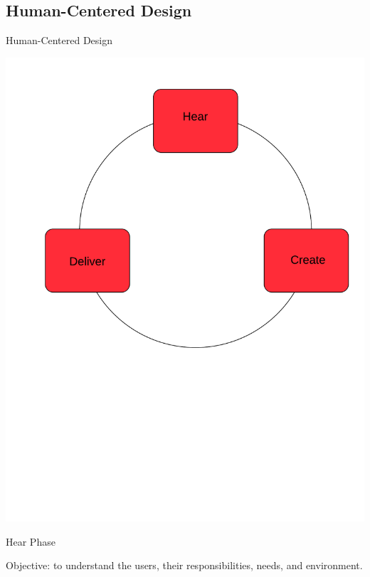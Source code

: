 \documentclass[xcolor=x11names, handout, compress]{beamer}
\renewcommand{\(}{\begin{columns}}
\renewcommand{\)}{\end{columns}}
\newcommand{\<}[1]{\begin{column}{#1}}
\renewcommand{\>}{\end{column}}
\begin{document}
\subsection{Human-Centered Design}
\begin{frame}[t]{Human-Centered Design}
\centerline{\includegraphics[scale=0.17]{hcd}}
\end{frame}

\begin{frame}[t]{Hear Phase}
\begin{block}{\textcolor{DodgerBlue4}{Objective: to understand the users, their responsibilities, needs, and environment.}}
\end{block}
\end{frame}
\end{document}
